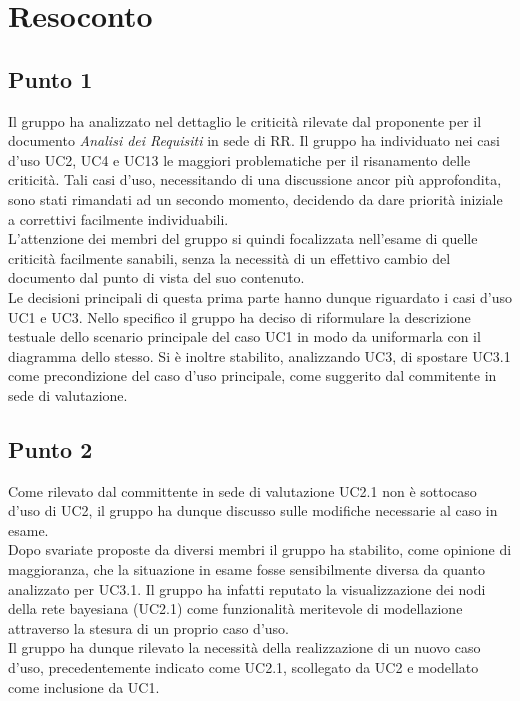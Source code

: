 \section{Resoconto}

\subsection{Punto 1}
Il gruppo ha analizzato nel dettaglio le criticità rilevate dal proponente per il documento \textit{Analisi dei Requisiti} in sede di RR. Il gruppo ha individuato nei casi d'uso UC2, UC4 e UC13 le maggiori problematiche per il risanamento delle criticità. Tali casi d'uso, necessitando di una discussione ancor più approfondita, sono stati rimandati ad un secondo momento, decidendo da dare priorità iniziale a correttivi facilmente individuabili.\\
L'attenzione dei membri del gruppo si quindi focalizzata nell'esame di quelle criticità facilmente sanabili, senza la necessità di un effettivo cambio del documento dal punto di vista del suo contenuto.\\
Le decisioni principali di questa prima parte hanno dunque riguardato i casi d'uso UC1 e UC3. Nello specifico il gruppo ha deciso di riformulare la descrizione testuale dello scenario principale del caso UC1 in modo da uniformarla con il diagramma dello stesso. Si è inoltre stabilito, analizzando UC3, di spostare UC3.1 come precondizione del caso d'uso principale, come suggerito dal commitente in sede di valutazione.

\subsection{Punto 2}
Come rilevato dal committente in sede di valutazione UC2.1 non è sottocaso d'uso di UC2, il gruppo ha dunque discusso sulle modifiche necessarie al caso in esame.\\
Dopo svariate proposte da diversi membri il gruppo ha stabilito, come opinione di maggioranza, che la situazione in esame fosse sensibilmente diversa da quanto analizzato per UC3.1. Il gruppo ha infatti reputato la visualizzazione dei nodi della rete bayesiana (UC2.1) come funzionalità meritevole di modellazione attraverso la stesura di un proprio caso d'uso.\\
Il gruppo ha dunque rilevato la necessità della realizzazione di un nuovo caso d'uso, precedentemente indicato come UC2.1, scollegato da UC2 e modellato come inclusione da UC1.

